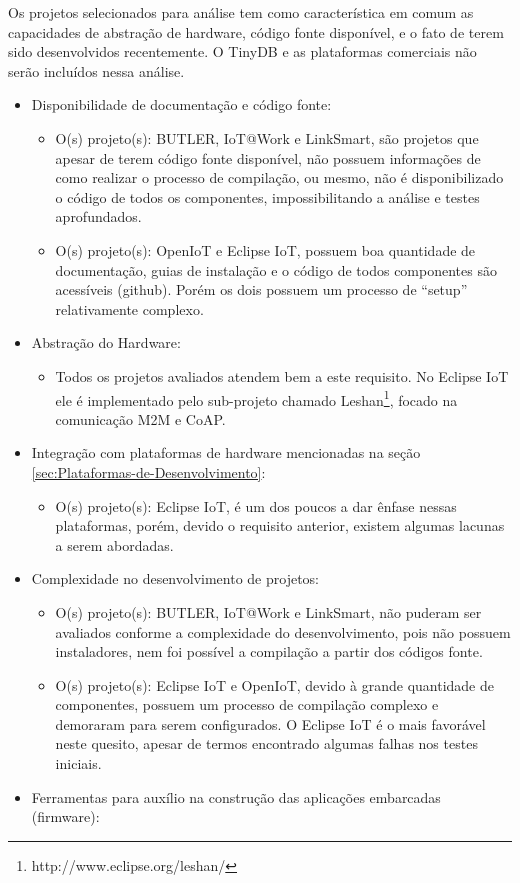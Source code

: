 Os projetos selecionados para análise tem como característica em comum
as capacidades de abstração de hardware, código fonte disponível,
e o fato de terem sido desenvolvidos recentemente. O TinyDB e as plataformas
comerciais não serão incluídos nessa análise.
\begin{itemize}
\item Disponibilidade de documentação e código fonte: 

\begin{itemize}
\item O(s) projeto(s): BUTLER, IoT@Work e LinkSmart, são projetos que apesar
de terem código fonte disponível, não possuem informações de como
realizar o processo de compilação, ou mesmo, não é disponibilizado
o código de todos os componentes, impossibilitando a análise e testes
aprofundados.
\item O(s) projeto(s): OpenIoT e Eclipse IoT, possuem boa quantidade de
documentação, guias de instalação e o código de todos componentes
são acessíveis (github). Porém os dois possuem um processo de ``setup''
relativamente complexo.
\end{itemize}
\item Abstração do Hardware:

\begin{itemize}
\item Todos os projetos avaliados atendem bem a este requisito. No Eclipse
IoT ele é implementado pelo sub-projeto chamado Leshan\footnote{http://www.eclipse.org/leshan/},
focado na comunicação M2M e CoAP.
\end{itemize}
\item Integração com plataformas de hardware mencionadas na seção \ref{sec:Plataformas-de-Desenvolvimento}:

\begin{itemize}
\item O(s) projeto(s): Eclipse IoT, é um dos poucos a dar ênfase nessas
plataformas, porém, devido o requisito anterior, existem algumas lacunas
a serem abordadas. 
\end{itemize}
\item Complexidade no desenvolvimento de projetos:

\begin{itemize}
\item O(s) projeto(s): BUTLER, IoT@Work e LinkSmart, não puderam ser avaliados
conforme a complexidade do desenvolvimento, pois não possuem instaladores,
nem foi possível a compilação a partir dos códigos fonte.
\item O(s) projeto(s): Eclipse IoT e OpenIoT, devido à grande quantidade
de componentes, possuem um processo de compilação complexo e demoraram
para serem configurados. O Eclipse IoT é o mais favorável neste quesito,
apesar de termos encontrado algumas falhas nos testes iniciais.
\end{itemize}
\item Ferramentas para auxílio na construção das aplicações embarcadas (firmware):


\end{itemize}
